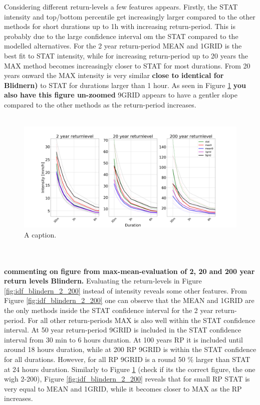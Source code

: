 Considering different return-levels a few features appears. Firstly, the STAT intensity and top/bottom percentile get increasingly larger compared to the other methods for short durations up to 1h with increasing return-period. This is probably due to the large confidence interval om the STAT compared to the modelled alternatives. For the 2 year return-period MEAN and 1GRID is the best fit to STAT intensity, while for increasing return-period up to 20 years the MAX method becomes increasingly closer to STAT for most durations. From 20 years onward the MAX intensity is very similar \textbf{close to identical for Blidnern)} to STAT for durations larger than 1 hour. As seen in Figure \ref{fig:intensity_blindern_200} \textbf{you also have this figure un-zoomed} 9GRID appears to have a gentler slope compared to the other methods as the return-period increases.  
\\
\\
\begin{figure}[hbt!]
    \centering
    \includegraphics[scale=0.1]{figures/ECE_1985_2_20_200_zomed.png}
    \caption{A caption.}
    \label{fig:intensity_blindern_200}
\end{figure}
\\
\\
\textbf{commenting on figure from max-mean-evaluation of 2, 20 and 200 year return levels Blindern.} Evaluating the return-levels in Figure \ref{fig:idf_blindern_2_200} instead of intensity reveals some other features. From Figure \ref{fig:idf_blindern_2_200} one can observe that the MEAN and 1GRID are the only methods inside the STAT confidence interval for the 2 year return-period. For all other return-periods MAX is also well within the STAT confidence interval. At 50 year return-period 9GRID is included in the STAT confidence interval from 30 min to 6 hours duration. At 100 years RP it is included until around 18 hours duration, while at 200 RP 9GRID is within the STAT confidence for all durations. However, for all RP 9GRID is a round 50 \% larger than STAT at 24 hours duration. Similarly to Figure \ref{fig:intensity_blindern_200} (check if its the correct figure, the one wigh 2-200), Figure \ref{fig:idf_blindern_2_200} reveals that for small RP STAT is very equal to MEAN and 1GRID, while it becomes closer to MAX as the RP increases.

